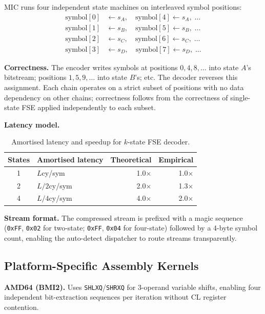 \documentclass[10pt,twocolumn]{article}
\begin{document}
MIC runs four independent state machines on interleaved symbol positions:
\begin{align*}
  \text{symbol}[0] &\leftarrow s_A, \quad \text{symbol}[4] \leftarrow s_A, \;\ldots \\
  \text{symbol}[1] &\leftarrow s_B, \quad \text{symbol}[5] \leftarrow s_B, \;\ldots \\
  \text{symbol}[2] &\leftarrow s_C, \quad \text{symbol}[6] \leftarrow s_C, \;\ldots \\
  \text{symbol}[3] &\leftarrow s_D, \quad \text{symbol}[7] \leftarrow s_D, \;\ldots
\end{align*}

\textbf{Correctness.} The encoder writes symbols at positions $0,4,8,\ldots$
into state $A$'s bitstream; positions $1,5,9,\ldots$ into state $B$'s; etc. The
decoder reverses this assignment. Each chain operates on a strict subset of
positions with no data dependency on other chains; correctness follows from the
correctness of single-state FSE applied independently to each subset.

\textbf{Latency model.}

\begin{table}[htbp]
\centering
\footnotesize
\setlength{\tabcolsep}{4pt}
\caption{Amortised latency and speedup for $k$-state FSE decoder.}
\label{tab:latency}
\begin{tabular}{clrr}
\toprule
States & Amortised latency & Theoretical & Empirical \\
\midrule
1 & $L$\;cy/sym   & 1.0$\times$ & 1.0$\times$ \\
2 & $L/2$\;cy/sym & 2.0$\times$ & 1.3$\times$ \\
4 & $L/4$\;cy/sym & 4.0$\times$ & 2.0$\times$ \\
\bottomrule
\end{tabular}
\end{table}

\textbf{Stream format.} The compressed stream is prefixed with a magic sequence
(\texttt{0xFF}, \texttt{0x02} for two-state; \texttt{0xFF}, \texttt{0x04} for
four-state) followed by a 4-byte symbol count, enabling the auto-detect
dispatcher to route streams transparently.

\subsection{Platform-Specific Assembly Kernels}

\textbf{AMD64 (BMI2).} Uses \texttt{SHLXQ}/\texttt{SHRXQ} for 3-operand
variable shifts, enabling four independent bit-extraction sequences per
iteration without CL register contention.
\end{document}
